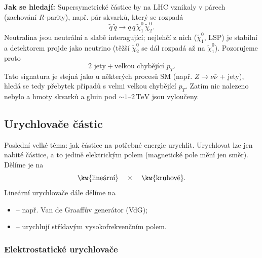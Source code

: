 \textbf{Jak se hledají:} Supersymetrické částice by na LHC vznikaly v párech (zachování
\(R\)-parity), např. pár skvarků, který se rozpadá
\[
  \tilde q\,\tilde q \to q\,q\,\tilde\chi^0_1\,\tilde\chi^0_2 .
\]
Neutralina jsou neutrální a slabě interagující; nejlehčí z nich (\(\tilde\chi^0_1\), LSP) je
stabilní a detektorem projde jako neutrino (těžší \(\tilde\chi^0_2\) se dál rozpadá až na
\(\tilde\chi^0_1\)). Pozorujeme proto
\[
  \text{2 jety} + \text{velkou chybějící } p_T .
\]
Tato signatura je stejná jako u některých procesů SM (např. \(Z\to\nu\bar\nu\) + jety), hledá
se tedy přebytek případů s velmi velkou chybějící \(p_T\). Zatím nic nalezeno nebylo a hmoty
skvarků a gluin pod \(\sim 1\)--\(2\,\mathrm{TeV}\) jsou vyloučeny.

\subsection{Urychlovače částic}

Poslední velké téma: jak částice na potřebné energie urychlit. Urychlovat lze jen nabité
částice, a to jedině elektrickým polem (magnetické pole mění jen směr). Dělíme je na
\[
  \text{\kw{lineární}} \quad\times\quad \text{\kw{kruhové}} .
\]
Lineární urychlovače dále dělíme na
\begin{itemize}[nosep]
  \item {} -- např. Van de Graaffův generátor (VdG);
  \item {} -- urychlují střídavým vysokofrekvenčním polem.
\end{itemize}

\subsubsection{Elektrostatické urychlovače}

